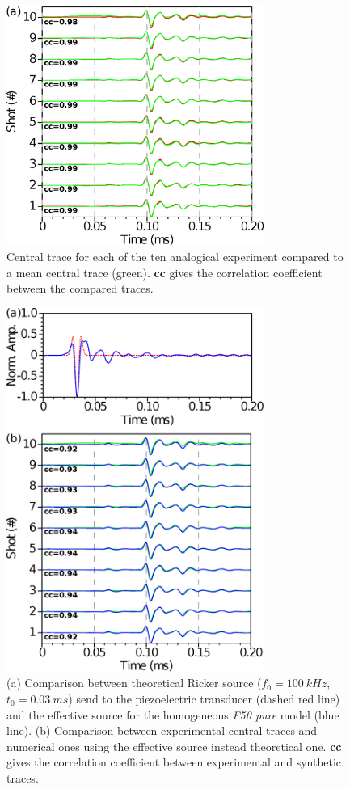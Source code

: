 \documentclass[manuscript,revised]{geophysics}
\begin{document}
\begin{figure}[!h]
	\centering
	\includegraphics[width=0.75\textwidth]{fig/musc_F50_CT.eps}
	\caption{Central trace for each of the ten analogical experiment compared to a mean central trace (green). \textbf{cc} gives the correlation coefficient between the compared traces.}
	\label{panel_central_traces_cc}
\end{figure}

\begin{figure}[!h]
	\centering
	\includegraphics[width=0.75\textwidth]{fig/spec_F50_CT_COMP.eps}
	\caption{(a) Comparison between theoretical Ricker source ($f_{0}=100\ kHz$, $t_{0}=0.03\ ms$) send to the piezoelectric transducer (dashed red line) and the effective source for the homogeneous \textit{F50 pure} model (blue line). (b) Comparison between experimental central traces and numerical ones using the effective source instead theoretical one. \textbf{cc} gives the correlation coefficient between experimental and synthetic traces.}
	\label{panel_srcest_2d_mean_comp}
\end{figure}
\end{document}
